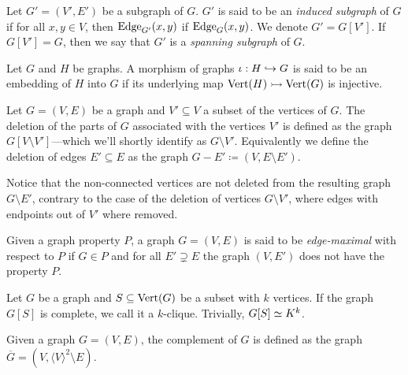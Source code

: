 \begin{definition}
    Let \(G' = (V', E')\) be a subgraph of \(G\). \(G'\) is said to be an
    \emph{induced subgraph} of \(G\) if for all \(x, y \in V\), then \(\operatorname{Edge}_{G'}(x,
    y)\) if \(\operatorname{Edge}_G(x, y)\). We denote \(G' = G[V']\). If \(G[V'] = G\), then we say
    that \(G'\) is a \emph{spanning subgraph} of \(G\).
\end{definition}

\begin{definition}\label{def: graph-embedding}
    Let \(G\) and \(H\) be graphs. A morphism of graphs \(\iota: H \hookrightarrow G\) is
    said to be an embedding of \(H\) into \(G\) if its underlying map \(\operatorname{Vert}(H) \rightarrowtail
    \operatorname{Vert}(G)\) is injective.
\end{definition}

\begin{definition}
    \label{def: deletion-graph}
    Let \(G = (V, E)\) be a graph and \(V' \subseteq V\) a subset of the
    vertices of \(G\). The deletion of the parts of \(G\) associated with the
    vertices \(V'\) is defined as the graph \(G[V \setminus V']\)---which we'll
    shortly identify as \(G \setminus V'\). Equivalently we define the deletion
    of edges \(E' \subseteq E\) as the graph \(G - E' \coloneq (V, E \setminus E')\).
\end{definition}

Notice that the non-connected vertices are not deleted from the resulting graph
\(G \setminus E'\), contrary to the case of the deletion of vertices \(G
\setminus V'\), where edges with endpoints out of \(V'\) where removed.

\begin{definition}
    \label{def: edge-maximal}
    Given a graph property \(P\), a graph \(G = (V, E)\) is said to be
    \emph{edge-maximal} with respect to \(P\) if \(G \in P\) and for all \(E'
    \supsetneq E\) the graph \((V, E')\) does not have the property \(P\).
\end{definition}

\begin{definition}[Clique]\label{def: clique}
    Let \(G\) be a graph and \(S \subseteq \operatorname{Vert}(G)\) be a subset with \(k\) vertices.
    If the graph \(G[S]\) is complete, we call it a \(k\)-clique. Trivially,
    \(G[S] \simeq K^k\).
\end{definition}

\begin{definition}\label{def: complement-graph}
    Given a graph \(G = (V, E)\), the complement of \(G\) is defined as the graph
    \(\overline G = (V, \langle V \rangle^2 \setminus E)\).
\end{definition}

